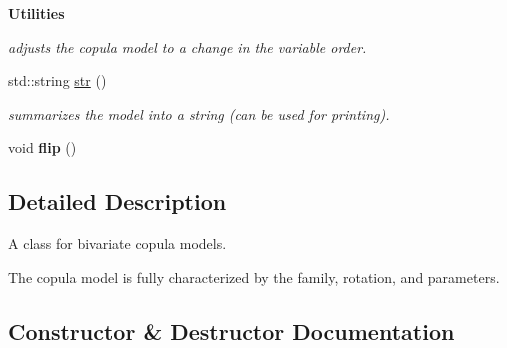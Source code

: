 \begin{Indent}{\bf Utilities}\par
{\em adjust\textquotesingle{}s the copula model to a change in the variable order. }\begin{DoxyCompactItemize}
\item 
std\+::string \hyperlink{classvinecopulib_1_1_bicop_a94b889d56f478dbeb156be4e31af5de5}{str} ()\hypertarget{classvinecopulib_1_1_bicop_a94b889d56f478dbeb156be4e31af5de5}{}\label{classvinecopulib_1_1_bicop_a94b889d56f478dbeb156be4e31af5de5}

\begin{DoxyCompactList}\small\item\em summarizes the model into a string (can be used for printing). \end{DoxyCompactList}\item 
void {\bfseries flip} ()\hypertarget{classvinecopulib_1_1_bicop_a59b7087b3857350df25ff684ab96f377}{}\label{classvinecopulib_1_1_bicop_a59b7087b3857350df25ff684ab96f377}

\end{DoxyCompactItemize}
\end{Indent}


\subsection{Detailed Description}
A class for bivariate copula models. 

The copula model is fully characterized by the family, rotation, and parameters. 

\subsection{Constructor \& Destructor Documentation}
